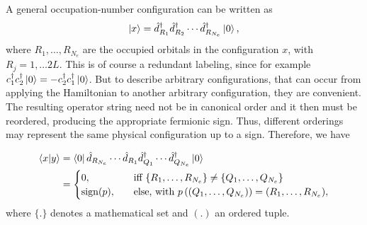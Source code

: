 \documentclass[../../main.tex]{subfiles}
\begin{document}
A general occupation-number configuration can be written as
\begin{equation}
    \left\lvert x \right\rangle
    =
    \hat d_{R_1}^\dagger
    \hat d_{R_2}^\dagger
    \cdots
    \hat d_{R_{N_{e}}}^\dagger
    \left\lvert 0 \right\rangle,
    \label{eq:configuration-state}
\end{equation}
where $R_1,\ldots,R_{N_{e}}$ are the occupied orbitals in the
configuration $x$, with $R_j = 1, \ldots 2L$. This is of course a redundant labeling, since for example $c_1^\dagger c_2^\dagger \left\lvert 0 \right\rangle= - c_2^\dagger c_1^\dagger \left\lvert 0 \right\rangle$. But to describe arbitrary configurations, that can occur from applying the Hamiltonian to another arbitrary configuration, they are convenient. The resulting operator string need not be in canonical order and it then must be reordered, producing the appropriate fermionic sign. Thus, different orderings may represent the same physical configuration up to a sign. Therefore, we have

\begin{align}
    \left\langle x \middle| y \right\rangle &= \left\langle 0 \right\rvert \hat d_{R_{N_e}} \cdots \hat d_{R_1} \hat d^\dagger_{Q_1} \cdots \hat d^\dagger_{Q_{N_e}} \left\lvert 0 \right\rangle \notag \\
    &= \begin{cases}
        0 , \quad &\text{iff } \{R_1, \ldots, R_{N_e}\} \neq \{Q_1, \ldots, Q_{N_e}\} \\
        \operatorname{sign} (p), \quad &\text{else, with } p\left( (Q_1, \ldots, Q_{N_e}) \right) = (R_1, \ldots, R_{N_e}) ,
    \end{cases} \label{eq:overlap_two_fermionic_configs}
\end{align}
where $\{ . \}$ denotes a mathematical set and $( . )$ an ordered tuple.
\end{document}

